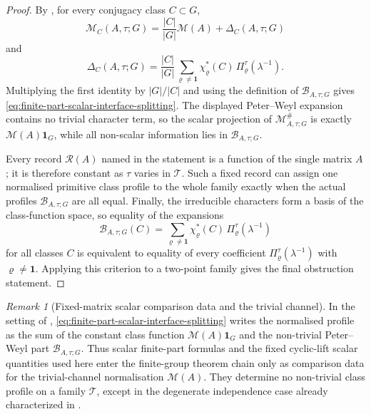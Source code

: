 \documentclass[11pt,a4paper]{amsart}
\theoremstyle{plain}
\theoremstyle{definition}
\theoremstyle{remark}
\newtheorem{remark}[theorem]{Remark}
\begin{document}
\begin{proof}
  By , for every conjugacy class
  \(C\subset G\),
  \[
    \mathcal M_C(A,\tau;G)
    =
    \frac{|C|}{|G|}\mathcal M(A)+\Delta_C(A,\tau;G)
  \]
  and
  \[
    \Delta_C(A,\tau;G)
    =
    \frac{|C|}{|G|}
      \sum_{\varrho\neq\mathbf1}
        \chi_\varrho^\ast(C)\,\Pi_\varrho^\tau(\lambda^{-1}).
  \]
  Multiplying the first identity by \(|G|/|C|\) and using the definition
  of \(\mathcal B_{A,\tau;G}\) gives
  \eqref{eq:finite-part-scalar-interface-splitting}. The displayed
  Peter--Weyl expansion contains no trivial character term, so the scalar
  projection of \(\mathcal M^\#_{A,\tau;G}\) is exactly
  \(\mathcal M(A)\mathbf1_G\), while all non-scalar information lies in
  \(\mathcal B_{A,\tau;G}\).

  Every record \(\mathcal R(A)\) named in the statement is a function of
  the single matrix \(A\); it is therefore constant as \(\tau\) varies in
  \(\mathscr T\). Such a fixed record can assign one normalised primitive
  class profile to the whole family exactly when the actual profiles
  \(\mathcal B_{A,\tau;G}\) are all equal. Finally, the irreducible
  characters form a basis of the class-function space, so equality of the
  expansions
  \[
    \mathcal B_{A,\tau;G}(C)
    =
    \sum_{\varrho\neq\mathbf1}
      \chi_\varrho^\ast(C)\,\Pi_\varrho^\tau(\lambda^{-1})
  \]
  for all classes \(C\) is equivalent to equality of every coefficient
  \(\Pi_\varrho^\tau(\lambda^{-1})\) with
  \(\varrho\neq\mathbf1\). Applying this criterion to a two-point family
  gives the final obstruction statement.
\end{proof}


\begin{remark}[Fixed-matrix scalar comparison data and the trivial channel]
  \label{cor:fixed-matrix-scalar-interface-only}
  In the setting of ,
  \eqref{eq:finite-part-scalar-interface-splitting} writes the normalised
  profile as the sum of the constant class function
  \(\mathcal M(A)\mathbf1_G\) and the non-trivial Peter--Weyl part
  \(\mathcal B_{A,\tau;G}\).  Thus scalar finite-part formulas and the fixed
  cyclic-lift scalar quantities used here enter the finite-group theorem chain
  only as comparison data for the trivial-channel normalisation
  \(\mathcal M(A)\).  They determine no non-trivial class profile on a family
  \(\mathscr T\), except in the degenerate independence case already
  characterized in
  .
\end{remark}
\end{document}
